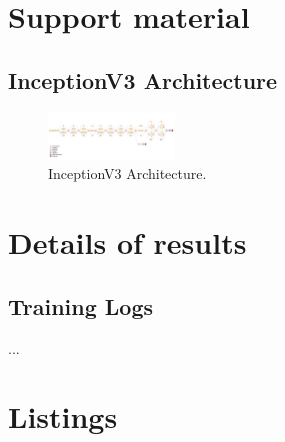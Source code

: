 \documentclass[
  twoside,
  11pt, a4paper,
  footinclude=true,
  headinclude=true,
  cleardoublepage=empty
]{scrbook}
\begin{document}
  

  \printindex


    \chapter{Support material} \label{support-material}
      \section{InceptionV3 Architecture} \label{appendix:inception-v3}
        \begin{figure}[h]
          \centering
          \includegraphics[angle=90,width=0.3\textwidth]{"./img/inception-v3"}
          \caption[InceptionV3 Architecture]{InceptionV3 Architecture.}
        \end{figure}

    \chapter{Details of results} \label{results}
      \section{Training Logs} \label{appendix:training}
        ...

    \chapter{Listings} \label{listings}
\end{document}

